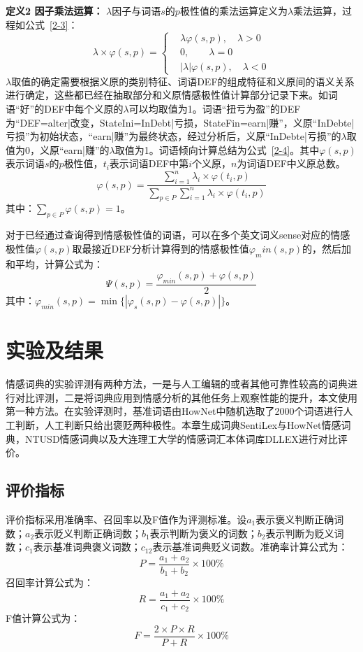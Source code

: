 \textbf{定义2 因子乘法运算：} $\lambda$因子与词语$s$的$p$极性值的乘法运算定义为$\lambda$乘法运算，过程如公式~\ref{2-3}：
\begin{equation}
\label{2-3}
\lambda \times \varphi(s,p) =\begin{cases}
& \lambda \varphi(s,p), \quad  \lambda >0\\
& 0, \quad\quad  \lambda=0\\
&|\lambda|\varphi(s,p), \quad  \lambda <0
\end{cases}
\end{equation}
$\lambda$取值的确定需要根据义原的类别特征、词语DEF的组成特征和义原间的语义关系进行确定，这些都已经在抽取部分和义原情感极性值计算部分记录下来。如词语“好”的DEF中每个义原的$\lambda$可以均取值为1。词语“扭亏为盈”的DEF为“DEF=alter|改变，StateIni=InDebt|亏损，StateFin=earn|赚”，义原“InDebte|亏损”为初始状态，“earn|赚”为最终状态，经过分析后，义原“InDebte|亏损”的$\lambda$取值为0，义原“earn|赚”的$\lambda$取值为1。词语倾向计算总结为公式~\ref{2-4}。其中$\varphi(s,p)$表示词语$s$的$p$极性值，$t_i$表示词语DEF中第$i$个义原，$n$为词语DEF中义原总数。
\begin{equation}
\label{2-4}
\varphi(s,p)=\dfrac{\sum_{i=1}^n\lambda_i\times\varphi(t_i,p)}{\sum_{p\in P}\sum_{i=1}^n\lambda_i\times\varphi(t_i,p)}
\end{equation}
其中：$\sum_{p \in P}\varphi(s,p)=1$。

对于已经通过查询得到情感极性值的词语，可以在多个英文词义sense对应的情感极性值$\varphi(s,p)$取最接近DEF分析计算得到的情感极性值$\varphi_min(s,p)$的，然后加和平均，计算公式为：
\begin{equation}
\Psi(s,p)=\dfrac{\varphi_{min}(s,p)+\varphi(s,p)}{2}
\end{equation}
其中：$\varphi_{min}(s,p)=\min \{|\varphi_s(s,p)-\varphi(s,p)|\}$。

\section{实验及结果}
情感词典的实验评测有两种方法，一是与人工编辑的或者其他可靠性较高的词典进行对比评测，二是将词典应用到情感分析的其他任务上观察性能的提升，本文使用第一种方法。在实验评测时，基准词语由HowNet中随机选取了2000个词语进行人工判断，人工判断只给出褒贬两种极性。本章生成词典SentiLex与HowNet情感词典，NTUSD情感词典以及大连理工大学的情感词汇本体词库DLLEX进行对比评价。

\subsection{评价指标}
评价指标采用准确率、召回率以及F值作为评测标准。设$a_1$表示褒义判断正确词数；$a_2$表示贬义判断正确词数；$b_1$表示判断为褒义的词数；$b_2$表示判断为贬义词数；$c_1$表示基准词典褒义词数；$c_12$表示基准词典贬义词数。准确率计算公式为：$$P=\dfrac{a_1+a_2}{b_1+b_2}\times 100\%$$
召回率计算公式为：$$R=\dfrac{a_1+a_2}{c_1+c_2}\times 100\%$$
F值计算公式为：$$F=\dfrac{2 \times P\times R}{P+R} \times100\%$$

